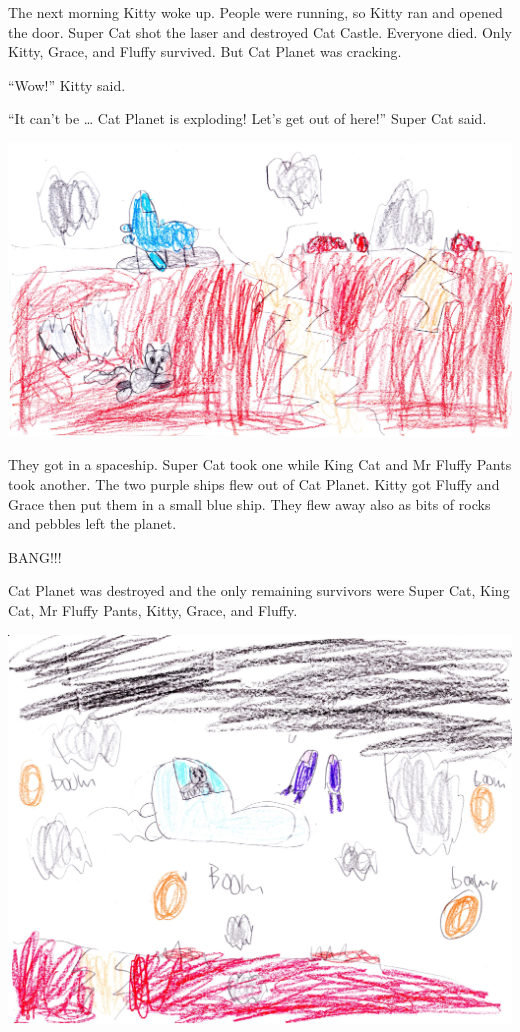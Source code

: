 \documentclass[12pt,oneside]{krantz}
\begin{document}
The next morning Kitty woke up. People were running, so Kitty ran and
opened the door. Super Cat shot the laser and destroyed Cat Castle.
Everyone died. Only Kitty, Grace, and Fluffy survived. But Cat Planet
was cracking.

``Wow!'' Kitty said.

``It can't be \ldots{} Cat Planet is exploding! Let's get out of here!''
Super Cat said.

\includegraphics{img/lava.jpg}

They got in a spaceship. Super Cat took one while King Cat and Mr Fluffy
Pants took another. The two purple ships flew out of Cat Planet. Kitty
got Fluffy and Grace then put them in a small blue ship. They flew away
also as bits of rocks and pebbles left the planet.

BANG!!!

Cat Planet was destroyed and the only remaining survivors were Super
Cat, King Cat, Mr Fluffy Pants, Kitty, Grace, and Fluffy.

\includegraphics{img/flying.jpg}
\end{document}
